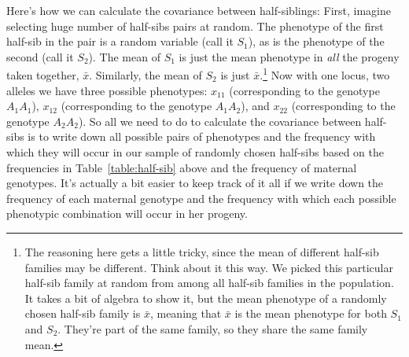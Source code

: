\documentclass[12pt]{article}
\begin{document}
Here's how we can calculate the covariance between half-siblings:
First, imagine selecting huge number of half-sibs pairs at random.
The phenotype of the first half-sib in the pair is a random variable
(call it $S_1$), as is the phenotype of the second (call it $S_2$).
The mean of $S_1$ is just the mean phenotype in {\it all\/} the
progeny taken together, $\bar x$.  Similarly, the mean of $S_2$ is
just $\bar x$.\footnote{The reasoning here gets a little tricky, since
  the mean of different half-sib families may be different. Think
  about it this way. We picked this particular half-sib family at
  random from among all half-sib families in the population. It takes
  a bit of algebra to show it, but the mean phenotype of a randomly
  chosen half-sib family is $\bar x$, meaning that $\bar x$ is the
  mean phenotype for both $S_1$ and $S_2$. They're part of the same
  family, so they share the same family mean.}  Now with one locus,
two alleles we have three possible phenotypes: $x_{11}$ (corresponding
to the genotype $A_1A_1$), $x_{12}$ (corresponding to the genotype
$A_1A_2$), and $x_{22}$ (corresponding to the genotype $A_2A_2$).  So
all we need to do to calculate the covariance between half-sibs is to
write down all possible pairs of phenotypes and the frequency with
which they will occur in our sample of randomly chosen half-sibs based
on the frequencies in Table~\ref{table:half-sib} above and the
frequency of maternal genotypes.  It's actually a bit easier to keep
track of it all if we write down the frequency of each maternal
genotype and the frequency with which each possible phenotypic
combination will occur in her progeny.
\end{document}
